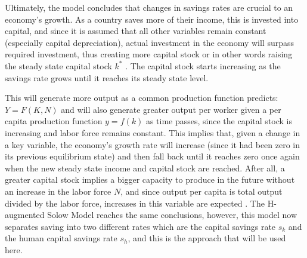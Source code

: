 \documentclass[12pt,twoside,a4paper]{article}
\numberwithin{equation}{section}
\begin{document}
Ultimately, the model concludes that changes in savings rates are crucial to an economy’s growth. As a country saves more of their income, this is invested into capital, and since it is assumed that all other variables remain constant (especially capital depreciation), actual investment in the economy will surpass required investment, thus creating more capital stock or in other words raising the steady state capital stock $k^*$ \parencite{Mankiw.2010}. The capital stock starts increasing as the savings rate grows until it reaches its steady state level. 

This will generate more output as a common production function predicts: $Y=F(K,N)$ and will also generate greater output per worker given a per capita production function $y=f(k)$ as time passes, since the capital stock is increasing and labor force remains constant. This implies that, given a change in a key variable, the economy's growth rate will increase (since it had been zero in its previous equilibrium state) and then fall back until it reaches zero once again when the new steady state income and capital stock are reached. After all, a greater capital stock implies a bigger capacity to produce in the future without an increase in the labor force $N$, and since output per capita is total output divided by the labor force, increases in this variable are expected \parencite{Abel.2014}. The H-augmented Solow Model reaches the same conclusions, however, this model now separates saving into two different rates which are the capital savings rate $s_k$ and the human capital savings rate $s_{h}$, and this is the approach that will be used here. 
\end{document}
